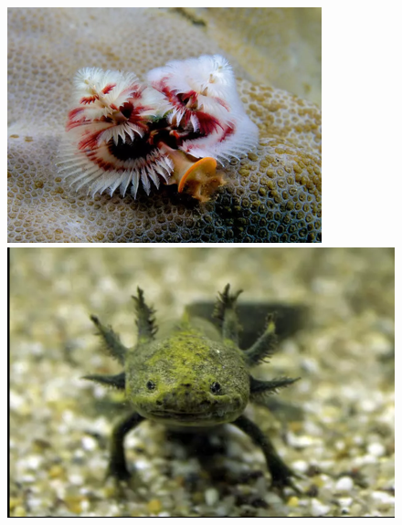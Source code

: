 \documentclass[10pt,a4paper]{report}
\begin{document}
	
	\begin{landscape} %
		
		
		\begin{figure}[!h] %
			\centering
			
			\begin{minipage}[t]{0.470\linewidth}
				\centering
				\includegraphics[width=\linewidth]{Resim1}
				\caption{\cite{ceylan2014hayvanlar}}
			\end{minipage}\hfill
			\begin{minipage}[t]{0.470\linewidth}
				\centering
				\includegraphics[width=\linewidth]{Resim2}
				\caption{\cite{ceylan2014hayvanlar}}
			\end{minipage}
			

\end{figure}
\end{landscape}
\end{document}
